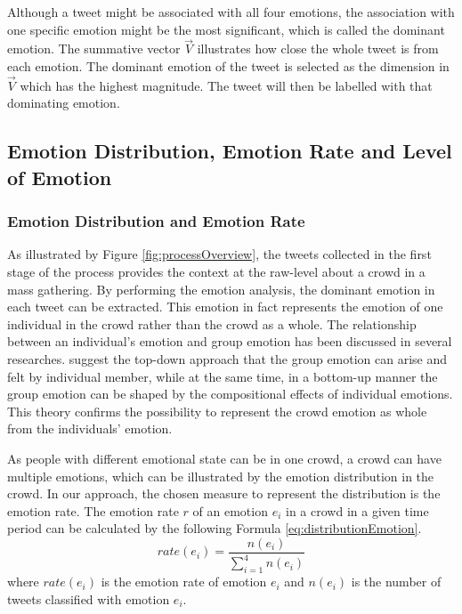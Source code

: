 Although a tweet might be associated with all four emotions, the association with one specific emotion might be the most significant, which is called the dominant emotion. The summative vector \(\vec{V}\) illustrates how close the whole tweet is from each emotion. The dominant emotion of the tweet is selected as the dimension in \(\vec{V}\) which has the highest magnitude. The tweet will then be labelled with that dominating emotion. 

\subsection{Emotion Distribution, Emotion Rate and Level of Emotion}

\subsubsection{Emotion Distribution and Emotion Rate}
As illustrated by Figure \ref{fig:processOverview}, the tweets collected in the first stage of the process provides the context at the raw-level about a crowd in a mass gathering. By performing the emotion analysis, the dominant emotion in each tweet can be extracted. This emotion in fact represents the emotion of one individual in the crowd rather than the crowd as a whole. The relationship between an individual's emotion and group emotion has been discussed in several researches. \citet{barsade1998group} suggest the top-down approach that the group emotion can arise and felt by individual member, while at the same time, in a bottom-up manner the group emotion can be shaped by the compositional effects of individual emotions. This theory confirms the possibility to represent the crowd emotion as whole from the individuals' emotion.

As people with different emotional state can be in one crowd, a crowd can have multiple emotions, which can be illustrated by the emotion distribution in the crowd. In our approach, the chosen measure to represent the distribution is the emotion rate. The emotion rate \(r\) of an emotion \(e_i\) in a crowd in a given time period can be calculated by the following Formula \ref{eq:distributionEmotion}.
\begin{equation}
\label{eq:distributionEmotion}
	rate(e_i) = \frac{n(e_i)}{\sum\limits_{i=1}^4 n(e_i)}
\end{equation}
where \(rate(e_i)\) is the emotion rate of emotion \(e_i\) and \(n(e_i)\) is the number of tweets classified with emotion \(e_i\).

